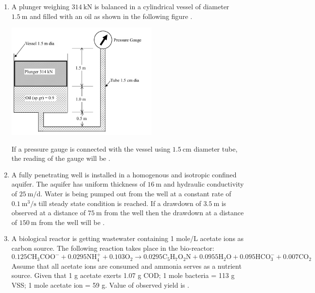 \documentclass[journal,12pt,onecolumn]{IEEEtran}
\theoremstyle{remark}
\begin{document}
\begin{enumerate}
\newpage

\item A plunger weighing $314\ \text{kN}$ is balanced in a cylindrical vessel of diameter $1.5\ \text{m}$ and filled with an oil  as shown in the following figure .

\begin{center}
\includegraphics[width=0.6\textwidth]{figs/img 5 (2).jpeg}
\end{center}

If a pressure gauge is connected with the vessel using $1.5\ \text{cm}$ diameter tube, the reading of the gauge will be \underline{\hspace{2cm}} . \hfill{}

\item A fully penetrating well is installed in a homogenous and isotropic confined aquifer. The aquifer has uniform thickness of $16\ \text{m}$ and hydraulic conductivity of $25\ \text{m/d}$. Water is being pumped out from the well at a constant rate of $0.1\ \text{m}^3/\text{s}$ till steady state condition is reached. If a drawdown of $3.5\ \text{m}$ is observed at a distance of $75\ \text{m}$ from the well then the drawdown at a distance of $150\ \text{m}$ from the well will be \underline{\hspace{2cm}} . \hfill{}

\newpage

\item A biological reactor is getting wastewater containing 1 mole/L acetate ions as carbon source. The following reaction takes place in the bio-reactor:
\[
0.125\mathrm{CH_3COO^-} + 0.0295\mathrm{NH_4^+} + 0.103\mathrm{O_2} \rightarrow 0.0295\mathrm{C_5H_7O_2N} + 0.0955\mathrm{H_2O} + 0.095\mathrm{HCO_3^-} + 0.007\mathrm{CO_2}
\]
Assume that all acetate ions are consumed and ammonia serves as a nutrient source. Given that 1 g acetate exerts 1.07 g COD; 1 mole bacteria = 113 g VSS; 1 mole acetate ion = 59 g. Value of observed yield is \underline{\hspace{2cm}} .  
\hfill{}


\end{enumerate}
\end{document}
